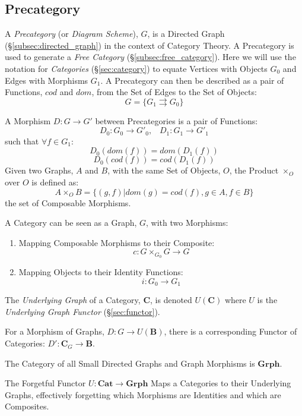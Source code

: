 \subsection{Precategory}\label{subsec:precategory}

A \emph{Precategory} (or \emph{Diagram Scheme}), $G$, is a Directed
Graph (\S\ref{subsec:directed_graph}) in the context of Category
Theory. A Precategory is used to generate a \emph{Free Category}
(\S\ref{subsec:free_category}). Here we will use the notation for
\emph{Categories} (\S\ref{sec:category}) to equate Vertices with
Objects $G_0$ and Edges with Morphisms $G_1$. A Precategory can then
be described as a pair of Functions, $cod$ and $dom$, from the Set of
Edges to the Set of Objects:
\[
    G = \{G_1 \rightrightarrows G_0\}
\]

A Morphism $D : G \rightarrow G'$ between Precategories is a pair of
Functions:
\[
    D_0 : G_0 \rightarrow G'_0, \;\;\; D_1 : G_1 \rightarrow G'_1
\]
such that $\forall f \in G_1$:
\[
    D_0(dom(f)) = dom(D_1(f))
\]\[
    D_0(cod(f)) = cod(D_1(f))
\]
Given two Graphs, $A$ and $B$, with the same Set of Objects, $O$, the
Product $\times_O$ over $O$ is defined as:
\[
    A \times_O B = \{ (g,f) | dom(g) = cod(f), g \in A, f \in B \}
\]
the set of Composable Morphisms.

A Category can be seen as a Graph, $G$, with two Morphisms:
\begin{enumerate}
    \item Mapping Composable Morphisms to their Composite:
        \[c : G \times_{G_0} G \rightarrow G\]
    \item Mapping Objects to their Identity Functions:
        \[i: G_0 \rightarrow G_1\]
\end{enumerate}
The \emph{Underlying Graph} of a Category, $\mathbf{C}$, is denoted
$U(\mathbf{C})$ where $U$ is the \emph{Underlying Graph Functor}
(\S\ref{sec:functor}).

For a Morphism of Graphs, $D : G \rightarrow U(\mathbf{B})$, there is
a corresponding Functor of Categories: $D' : \mathbf{C}_G \rightarrow
\mathbf{B}$.

The Category of all Small Directed Graphs and Graph Morphisms is
$\mathbf{Grph}$.

The Forgetful Functor $U : \mathbf{Cat} \rightarrow \mathbf{Grph}$
Maps a Categories to their Underlying Graphs, effectively forgetting
which Morphisms are Identities and which are Composites.



